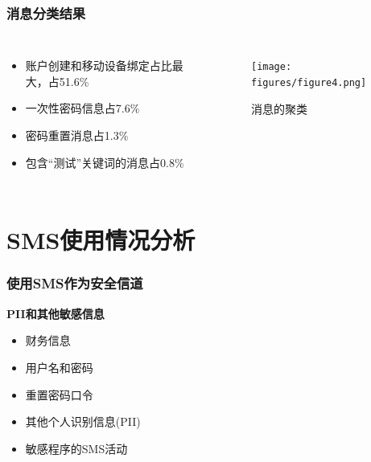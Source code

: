\documentclass[10pt,aspectratio=43,mathserif]{beamer}
\renewcommand{\small}{\fontsize{8pt}{9.6pt}\selectfont}
\begin{document}
\begin{frame}
    \frametitle{\textbf{消息分类结果}}
    \begin{columns}
        \small
        \begin{itemize}
            \item 账户创建和移动设备绑定占比最大，占51.6\%
            \item 一次性密码信息占7.6\%
            \item 密码重置消息占1.3\%
            \item 包含“测试”关键词的消息占0.8\%
        \end{itemize}

        \begin{figure}[!t]
            \centering
            \texttt{[image: figures/figure4.png]}
            \caption{消息的聚类}
            \label{figure3_OTT}
        \end{figure}
    \end{columns}
\end{frame}


\section[分析]{SMS使用情况分析}

\begin{frame}
    \frametitle{\textbf{使用SMS作为安全信道}}
    \begin{block}{\textbf{PII和其他敏感信息}}
        \begin{itemize}
            \item 财务信息
            \item 用户名和密码
            \item 重置密码口令
            \item 其他个人识别信息(PII)
            \item 敏感程序的SMS活动
        \end{itemize}
    \end{block}
\end{frame}
\end{document}
